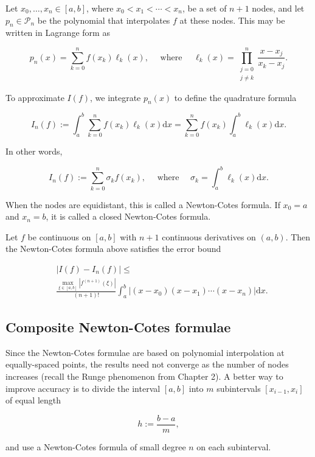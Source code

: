 \begin{definition}
  Let \(x_0, \ldots, x_n \in[a, b]\), where \(x_0<x_1<\cdots<x_n\), be a set of \(n+1\) nodes, and let \(p_n \in \mathcal{P}_n\) be the polynomial that interpolates \(f\) at these nodes. This may be written in Lagrange form as

\[
p_n(x)=\sum_{k=0}^n f\left(x_k\right) \ell_k(x), \quad \text { where } \quad \ell_k(x)=\prod_{\substack{j=0 \\ j \neq k}}^n \frac{x-x_j}{x_k-x_j} .
\]

To approximate \(I(f)\), we integrate \(p_n(x)\) to define the quadrature formula

\[
I_n(f):=\int_a^b \sum_{k=0}^n f\left(x_k\right) \ell_k(x) \mathrm{d} x=\sum_{k=0}^n f\left(x_k\right) \int_a^b \ell_k(x) \mathrm{d} x .
\]

In other words,

\[
I_n(f):=\sum_{k=0}^n \sigma_k f\left(x_k\right), \quad \text { where } \quad \sigma_k=\int_a^b \ell_k(x) \mathrm{d} x .
\]

When the nodes are equidistant, this is called a Newton-Cotes formula. If \(x_0=a\) and \(x_n=b\), it is called a closed Newton-Cotes formula.
\end{definition}  

\begin{theorem}
  
Let \(f\) be continuous on \([a, b]\) with \(n+1\) continuous derivatives on \((a, b)\). Then the Newton-Cotes formula above satisfies the error bound

\[
\begin{aligned}
& \left|I(f)-I_n(f)\right| \leq \\
& \frac{\max _{\xi \in[a, b]}\left|f^{(n+1)}(\xi)\right|}{(n+1)!} \int_a^b\left|\left(x-x_0\right)\left(x-x_1\right) \cdots\left(x-x_n\right)\right| \mathrm{d} x .
\end{aligned}
\]

\end{theorem}

\subsection{Composite Newton-Cotes formulae}

\begin{remark}
  Since the Newton-Cotes formulae are based on polynomial interpolation at equally-spaced points, the results need not converge as the number of nodes increases (recall the Runge phenomenon from Chapter 2). A better way to improve accuracy is to divide the interval \([a, b]\) into \(m\) subintervals \(\left[x_{i-1}, x_i\right]\) of equal length

\[
h:=\frac{b-a}{m},
\]

and use a Newton-Cotes formula of small degree \(n\) on each subinterval.
\end{remark}

